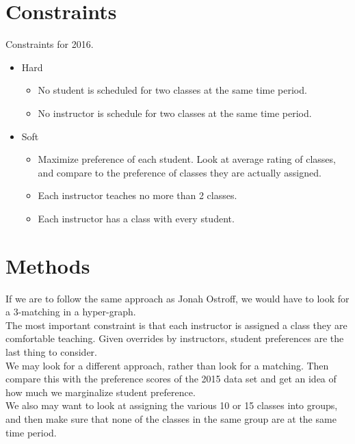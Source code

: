 \documentclass[11pt]{article}
\begin{document}
\section{Constraints}
Constraints for 2016. 
\begin{itemize}
	\item Hard
	\begin{itemize}
		\item No student is scheduled for two classes at the same time period.
		\item No instructor is schedule for two classes at the same time period.
	\end{itemize}
	\item Soft
	\begin{itemize}
	\item Maximize preference of each student. Look at average rating of classes, and compare to the preference of classes they are actually assigned.
	\item Each instructor teaches no more than 2 classes.
	\item Each instructor has a class with every student.
	\end{itemize}
\end{itemize}


\section{Methods}
If we are to follow the same approach as Jonah Ostroff, we would have to look for a 3-matching in a hyper-graph.\\
\indent The most important constraint is that each instructor is assigned a class they are comfortable teaching. Given overrides by instructors, student preferences are the last thing to consider.\\
\indent We may look for a different approach, rather than look for a matching. Then compare this with the preference scores of the 2015 data set and get an idea of how much we marginalize student preference.\\
\indent We also may want to look at assigning the various 10 or 15 classes into groups, and then make sure that none of the classes in the same group are at the same time period.
\end{document}
